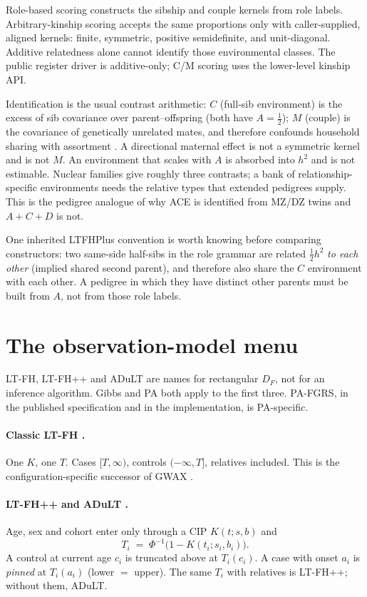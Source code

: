 \documentclass[11pt,a4paper]{article}
\newcommand{\h}{h^{2}}
\begin{document}
Role-based scoring constructs the sibship and couple kernels from role
labels. Arbitrary-kinship scoring accepts the same proportions only
with caller-supplied, aligned kernels: finite, symmetric, positive
semidefinite, and unit-diagonal. Additive relatedness alone cannot
identify those environmental classes. The public register driver is
additive-only; C/M scoring uses the lower-level kinship API.

Identification is the usual contrast arithmetic: $C$ (full-sib
environment) is the excess of sib covariance over parent--offspring
(both have $A=\tfrac12$); $M$ (couple) is the covariance of
genetically unrelated mates, and therefore confounds household
sharing with assortment \cite{robinson2017}.
A directional maternal effect is not a symmetric kernel and is not
$M$.
An environment that scales with $A$ is absorbed into $\h$ and is
not estimable.
Nuclear families give roughly three contrasts; a bank of
relationship-specific environments needs the relative types that
extended pedigrees supply.
This is the pedigree analogue of why ACE is identified from MZ/DZ
twins and $A+C+D$ is not.

One inherited LTFHPlus convention is worth knowing before comparing
constructors: two same-side half-sibs in the role grammar are
related $\tfrac12\h$ \emph{to each other} (implied shared second
parent), and therefore also share the $C$ environment with each other.
A pedigree in which they have distinct other parents must be built
from $A$, not from those role labels.

\section{The observation-model menu}
\label{sec:obs}

LT-FH, LT-FH++ and ADuLT are names for rectangular $D_F$, not for an
inference algorithm.
Gibbs and PA both apply to the first three.
PA-FGRS, in the published specification and in the implementation,
is PA-specific.

\paragraph{Classic LT-FH \cite{hujoel2020}.}
One $K$, one $T$.
Cases $[T,\infty)$, controls $(-\infty,T]$, relatives included.
This is the configuration-specific successor of GWAX \cite{liu2017}.

\paragraph{LT-FH++ and ADuLT \cite{pedersen2022,pedersen2023}.}
Age, sex and cohort enter only through a CIP $K(t;s,b)$ and
\begin{equation}
  T_i \;=\; \Phi^{-1}\!\bigl(1-K(t_i;s_i,b_i)\bigr).
\end{equation}
A control at current age $c_i$ is truncated above at $T_i(c_i)$.
A case with onset $a_i$ is \emph{pinned} at $T_i(a_i)$ (lower $=$
upper).
The same $T_i$ with relatives is LT-FH++; without them, ADuLT.
\end{document}
